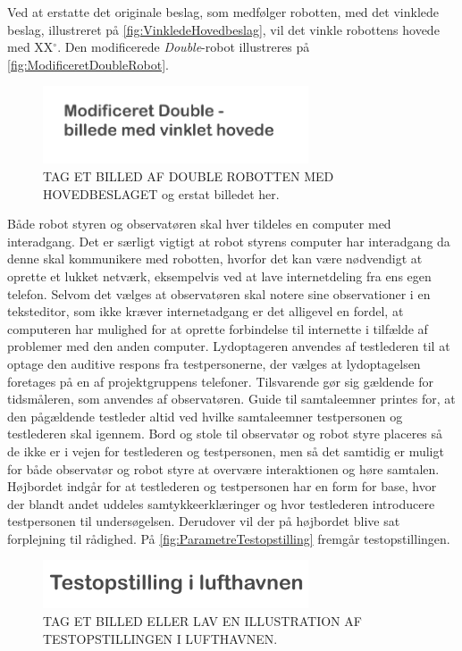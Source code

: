 \noindent
%
Ved at erstatte det originale beslag, som medfølger robotten, med det vinklede beslag, illustreret på \autoref{fig:VinkledeHovedbeslag}, vil det vinkle robottens hovede med XX$^{\circ}$. Den modificerede \textit{Double}-robot illustreres på \autoref{fig:ModificeretDoubleRobot}.
%
\begin{figure}[H]
\centering
\includegraphics[width = 0.7\textwidth]{Figure/ModificeretDouble} 
\caption{TAG ET BILLED AF DOUBLE ROBOTTEN MED HOVEDBESLAGET og erstat billedet her.}
\label{fig:ModificeretDoubleRobot}
\end{figure}
\noindent
%
Både robot styren og observatøren skal hver tildeles en computer med interadgang. Det er særligt vigtigt at robot styrens computer har interadgang da denne skal kommunikere med robotten, hvorfor det kan være nødvendigt at oprette et lukket netværk, eksempelvis ved at lave internetdeling fra ens egen telefon. Selvom det vælges at observatøren skal notere sine observationer i en teksteditor, som ikke kræver internetadgang er det alligevel en fordel, at computeren har mulighed for at oprette forbindelse til internette i tilfælde af problemer med den anden computer. Lydoptageren anvendes af testlederen til at optage den auditive respons fra testpersonerne, der vælges at lydoptagelsen foretages på en af projektgruppens telefoner. Tilsvarende gør sig gældende for tidsmåleren, som anvendes af observatøren. Guide til samtaleemner printes for, at den pågældende testleder altid ved hvilke samtaleemner testpersonen og testlederen skal igennem. Bord og stole til observatør og robot styre placeres så de ikke er i vejen for testlederen og testpersonen, men så det samtidig er muligt for både observatør og robot styre at overvære interaktionen og høre samtalen. Højbordet indgår for at testlederen og testpersonen har en form for base, hvor der blandt andet uddeles samtykkeerklæringer og hvor testlederen introducere testpersonen til undersøgelsen. Derudover vil der på højbordet blive sat forplejning til rådighed. På \autoref{fig:ParametreTestopstilling} fremgår testopstillingen.   
%
\begin{figure}[H]
\centering
\includegraphics[width = 0.7\textwidth]{Figure/ParametreTestopstilling} 
\caption{TAG ET BILLED ELLER LAV EN ILLUSTRATION AF TESTOPSTILLINGEN I LUFTHAVNEN.}
\label{fig:ParametreTestopstilling}
\end{figure}
\noindent
%  

